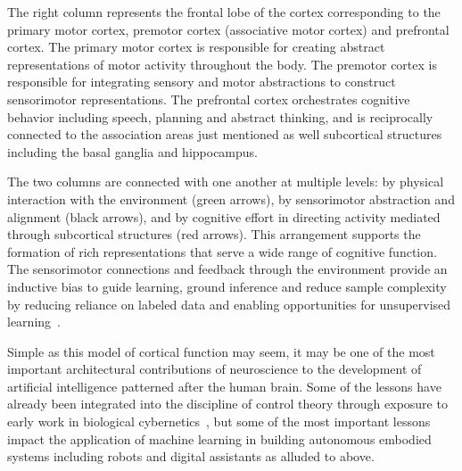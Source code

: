 \documentclass[letterpaper,11pt]{article}
\begin{document}
The right column represents the frontal lobe of the cortex corresponding to the primary motor cortex, premotor cortex (associative motor cortex) and prefrontal cortex. The primary motor cortex is responsible for creating abstract representations of motor activity throughout the body. The premotor cortex is responsible for integrating sensory and motor abstractions to construct sensorimotor representations. The prefrontal cortex orchestrates cognitive behavior including speech, planning and abstract thinking, and is reciprocally connected to the association areas just mentioned as well subcortical structures including the basal ganglia and hippocampus.

The two columns are connected with one another at multiple levels: by physical interaction with the environment (green arrows), by sensorimotor abstraction and alignment (black arrows), and by cognitive effort in directing activity mediated through subcortical structures (red arrows). This arrangement supports the formation of rich representations that serve a wide range of cognitive function. The sensorimotor connections and feedback through the environment provide an inductive bias to guide learning, ground inference and reduce sample complexity by reducing reliance on labeled data and enabling opportunities for unsupervised learning~\cite{BarlowNC-89}.

Simple as this model of cortical function may seem, it may be one of the most important architectural contributions of neuroscience to the development of artificial intelligence patterned after the human brain. Some of the lessons have already been integrated into the discipline of control theory through exposure to early work in biological cybernetics~\cite{FukushimaBC-80,Lettvinetal59,Jackson1958selected,GibsonPERCEPTION-50,McCullochandPitts43,vonUexk1926theoretical}, but some of the most important lessons impact the application of machine learning in building autonomous embodied systems including robots and digital assistants as alluded to above. 





\end{document}

